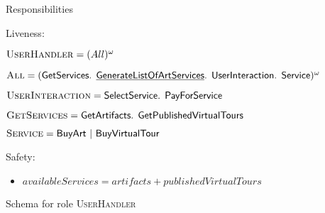 \documentclass[paper=letter, fontsize=12pt]{article}
\begin{document}
\begin{figure}[H]
\begin{center}
{{\setlength\parindent{14pt} Responsibilities
\par \setlength\parindent{14pt} Liveness:
\par\setlength\parindent{75pt}$\text{\textsc{UserHandler}} = (All)^{\omega}$ 
\par\setlength\parindent{75pt}$\text{\textsc{All}} = (\text{{\fontfamily{\sfdefault}\selectfont 
GetServices. \underline{GenerateListOfArtServices}. UserInteraction. Service}})^{\omega}$
\par\setlength\parindent{75pt}$\text{\textsc{UserInteraction}} = \text{{\fontfamily{\sfdefault}\selectfont SelectService. PayForService}}$
\par\setlength\parindent{75pt}$\text{\textsc{GetServices}} = \text{{\fontfamily{\sfdefault}\selectfont GetArtifacts. GetPublishedVirtualTours}}$
\par\setlength\parindent{75pt}$\text{\textsc{Service}} = \text{{\fontfamily{\sfdefault}\selectfont BuyArt | BuyVirtualTour}}$

\par \setlength\parindent{14pt} Safety:
\begin{itemize}[leftmargin=20mm]
\item $availableServices = artifacts + publishedVirtualTours$
\end{itemize}
    }%
}
\caption{Schema for role \textsc{UserHandler}}
\label{fig:role_user_handler}
\end{center}
\end{figure}
\end{document}
